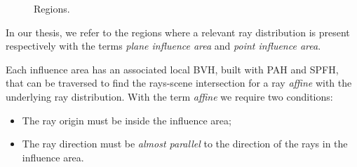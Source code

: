 \documentclass[11pt,a4paper,twocolumn]{article}
\begin{document}
\begin{figure}[H]
    \centering 
	\qquad
    \caption{Regions.}
    \label{fig:regions}
\end{figure}

In our thesis, we refer to the regions where a relevant ray distribution is present respectively with the terms \textit{plane influence area} and \textit{point influence area}.

Each influence area has an associated local BVH, built with PAH and SPFH, that can be traversed to find the rays-scene intersection for a ray \textit{affine} with the underlying ray distribution. With the term \textit{affine} we require two conditions:
\begin{itemize}
    \item The ray origin must be inside the influence area;
    \item The ray direction must be \textit{almost parallel} to the direction of the rays in the influence area.
\end{itemize}
\end{document}
